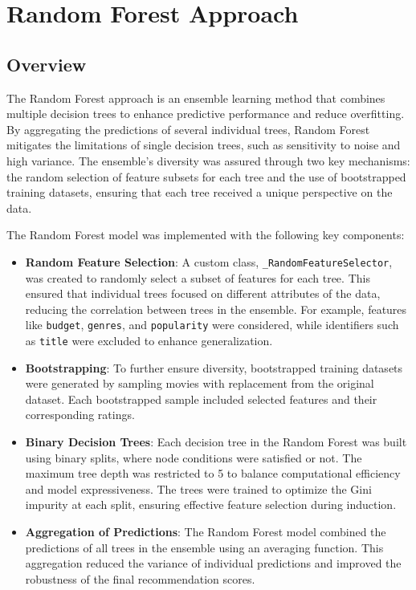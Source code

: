 \documentclass[a4paper,9pt]{article}
\begin{document}
\clearpage
\section{Random Forest Approach}
\subsection{Overview}
The Random Forest approach is an ensemble learning method that combines multiple decision trees
to enhance predictive performance and reduce overfitting.
By aggregating the predictions of several individual trees, Random Forest mitigates the limitations of
single decision trees, such as sensitivity to noise and high variance.
The ensemble's diversity was assured through two key mechanisms: the random selection of feature
subsets for each tree and the use of bootstrapped training datasets, ensuring that each tree received
a unique perspective on the data.

The Random Forest model was implemented with the
following key components:

\begin{itemize}
	\item \textbf{Random Feature Selection}:
	      A custom class, \texttt{\_RandomFeatureSelector}, was created to randomly select a subset of features for each tree. This ensured that individual trees focused on different attributes of the data, reducing the correlation between trees in the ensemble. For example, features like \texttt{budget}, \texttt{genres}, and \texttt{popularity} were considered, while identifiers such as \texttt{title} were excluded to enhance generalization.
	\item \textbf{Bootstrapping}:
	      To further ensure diversity, bootstrapped training datasets were generated by sampling movies with replacement from the original dataset. Each bootstrapped sample included selected features and their corresponding ratings.
	\item \textbf{Binary Decision Trees}:
	      Each decision tree in the Random Forest was built using binary splits, where node conditions were satisfied or not. The maximum tree depth was restricted to 5 to balance computational efficiency and model expressiveness. The trees were trained to optimize the Gini impurity at each split, ensuring effective feature selection during induction.
	\item \textbf{Aggregation of Predictions}:
	      The Random Forest model combined the predictions of all trees in the ensemble using an averaging function. This aggregation reduced the variance of individual predictions and improved the robustness of the final recommendation scores.
\end{itemize}
\end{document}
